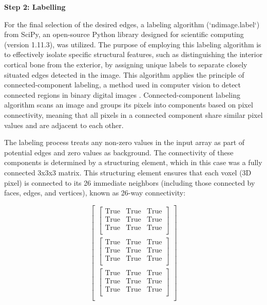 \documentclass{micro-econ-thesis}
\begin{document}
\textbf{Step 2: Labelling}

For the final selection of the desired edges, a labeling algorithm (`ndimage.label`) from SciPy, an open-source Python library designed for scientific computing (version 1.11.3), was utilized. The purpose of employing this labeling algorithm is to effectively isolate specific structural features, such as distinguishing the interior cortical bone from the exterior, by assigning unique labels to separate closely situated edges detected in the image. This algorithm applies the principle of connected-component labeling, a method used in computer vision to detect connected regions in binary digital images \parencite{dillencourt_general_1992}. Connected-component labeling algorithm scans an image and groups its pixels into components based on pixel connectivity, meaning that all pixels in a connected component share similar pixel values and are adjacent to each other.

The labeling process treats any non-zero values in the input array as part of potential edges and zero values as background. The connectivity of these components is determined by a structuring element, which in this case was a fully connected 3x3x3 matrix. This structuring element ensures that each voxel (3D pixel) is connected to its 26 immediate neighbors (including those connected by faces, edges, and vertices), known as 26-way connectivity:

$$
\begin{bmatrix}
	\begin{bmatrix}
		\text{True} & \text{True} & \text{True} \\
		\text{True} & \text{True} & \text{True} \\
		\text{True} & \text{True} & \text{True} \\
	\end{bmatrix} \\
	\begin{bmatrix}
		\text{True} & \text{True} & \text{True} \\
		\text{True} & \text{True} & \text{True} \\
		\text{True} & \text{True} & \text{True} \\
	\end{bmatrix} \\
	\begin{bmatrix}
		\text{True} & \text{True} & \text{True} \\
		\text{True} & \text{True} & \text{True} \\
		\text{True} & \text{True} & \text{True} \\
	\end{bmatrix} \\
\end{bmatrix}
$$
\end{document}
